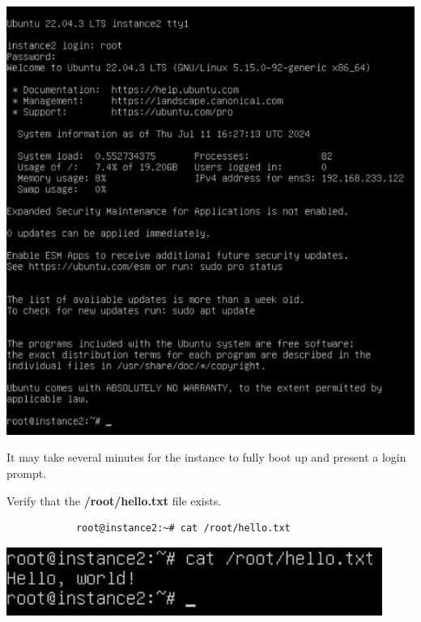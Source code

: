 \documentclass[letterpaper, 12pt]{article}
\begin{document}
\begin{enumerate}
\begin{labstep}
        \begin{center}
            \includegraphics[width=\linewidth]{images/part2/step15.png}
        \end{center}
    \end{labstep}

    \begin{notebox}
        It may take several minutes for the instance to fully boot up and present a login prompt.
    \end{notebox}

    \begin{labstep}
        Verify that the \textbf{/root/hello.txt} file exists.
        \begin{lstlisting}
            root@instance2:~# cat /root/hello.txt
        \end{lstlisting}

        \begin{center}
            \includegraphics[width=\linewidth]{images/part2/step16.png}
        \end{center}
    \end{labstep}


\end{enumerate}
\end{document}
